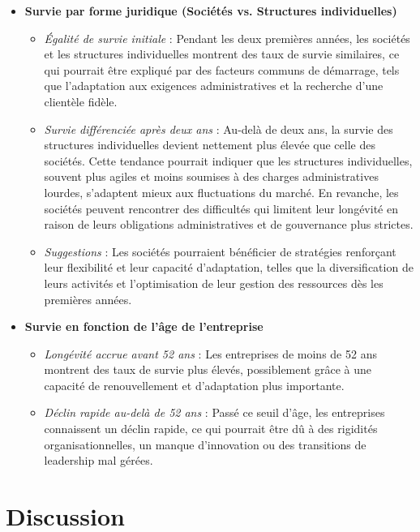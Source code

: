 \documentclass[a4paper,12pt]{report}
\begin{document}
\begin{itemize}
    \item \textbf{Survie par forme juridique (Sociétés vs. Structures individuelles)}
    \begin{itemize}
        \item \textit{Égalité de survie initiale} : Pendant les deux premières années, les sociétés et les structures individuelles montrent des taux de survie similaires, ce qui pourrait être expliqué par des facteurs communs de démarrage, tels que l’adaptation aux exigences administratives et la recherche d’une clientèle fidèle.
        \item \textit{Survie différenciée après deux ans} : Au-delà de deux ans, la survie des structures individuelles devient nettement plus élevée que celle des sociétés. Cette tendance pourrait indiquer que les structures individuelles, souvent plus agiles et moins soumises à des charges administratives lourdes, s’adaptent mieux aux fluctuations du marché. En revanche, les sociétés peuvent rencontrer des difficultés qui limitent leur longévité en raison de leurs obligations administratives et de gouvernance plus strictes.
        \item \textit{Suggestions} : Les sociétés pourraient bénéficier de stratégies renforçant leur flexibilité et leur capacité d’adaptation, telles que la diversification de leurs activités et l’optimisation de leur gestion des ressources dès les premières années.
    \end{itemize}

    \item \textbf{Survie en fonction de l’âge de l’entreprise}
    \begin{itemize}
        \item \textit{Longévité accrue avant 52 ans} : Les entreprises de moins de 52 ans montrent des taux de survie plus élevés, possiblement grâce à une capacité de renouvellement et d’adaptation plus importante.
        \item \textit{Déclin rapide au-delà de 52 ans} : Passé ce seuil d’âge, les entreprises connaissent un déclin rapide, ce qui pourrait être dû à des rigidités organisationnelles, un manque d'innovation ou des transitions de leadership mal gérées.
    \end{itemize}
\end{itemize}
 


\chapter{Discussion}
\end{document}

